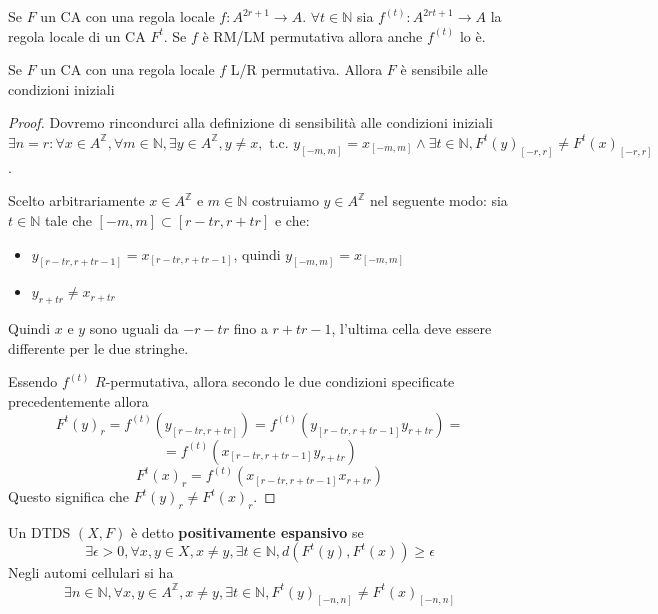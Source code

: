 \begin{teorema}
    Se $F$ un CA con una regola locale $f:A^{2r+1}\rightarrow A$. $\forall t\in \mathbb{N}$
    sia $f^{(t)}:A^{2rt+1}\rightarrow A$ la regola locale di un CA $F^t$. Se $f$
    è RM/LM permutativa allora anche $f^{(t)}$ lo è.
\end{teorema}

\begin{nota}
    Se $F$ un CA con una regola locale $f$ L/R permutativa. Allora $F$ è sensibile
    alle condizioni iniziali
    \begin{proof}
        Dovremo rincondurci alla definizione di sensibilità alle condizioni iniziali
        $\exists n=r: \forall x\in A^\mathbb{Z}, \forall m\in \mathbb{N},
            \exists y \in A^\mathbb{Z}, y\ne x, \text{ t.c. } y_{[-m,m]} = x_{[-m,m]}\land
            \exists t\in \mathbb{N},F^t(y)_{[-r,r]} \ne F^t(x)_{[-r,r]}$.

        Scelto arbitrariamente $x\in A^\mathbb{Z}$ e $m\in \mathbb{N}$ costruiamo
        $y\in A^\mathbb{Z}$ nel seguente modo: sia $t\in\mathbb{N}$ tale che
        $[-m,m]\subset [r-tr,r+tr]$ e che:
        \begin{itemize}
            \item $y_{[r-tr, r+tr-1]} = x_{[r-tr, r+tr-1]}$, quindi $y_{[-m,m]} = x_{[-m,m]}$
            \item $y_{r+tr} \ne x_{r+tr}$
        \end{itemize}
        Quindi $x$ e $y$ sono uguali da $-r-tr$ fino a $r+tr-1$, l'ultima cella
        deve essere differente per le due stringhe.

        Essendo $f^{(t)}$ $R$-permutativa, allora secondo le due condizioni
        specificate precedentemente allora
        $$F^t(y)_r=f^{(t)}(y_{[r-tr, r+tr]})=f^{(t)}(y_{[r-tr, r+tr-1]}y_{r+tr})=$$
        $$=f^{(t)}(x_{[r-tr, r+tr-1]}y_{r+tr})$$
        $$F^t(x)_r=f^{(t)}(x_{[r-tr, r+tr-1]}x_{r+tr}) $$
        Questo significa che $F^t(y)_r \ne F^t(x)_r$.
    \end{proof}
\end{nota}

\begin{definizione}
    Un DTDS $(X,F)$ è detto \textbf{positivamente espansivo} se
    $$\exists \epsilon >0, \forall x,y\in X, x\ne y, \exists t\in \mathbb{N}, d(F^t(y),F^t(x))\ge \epsilon$$
    Negli automi cellulari si ha
    $$\exists n\in \mathbb{N}, \forall x,y\in A^\mathbb{Z}, x\ne y, \exists t\in \mathbb{N}, F^t(y)_{[-n,n]} \ne F^t(x)_{[-n,n]}$$
\end{definizione}

